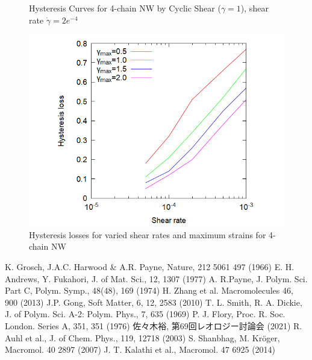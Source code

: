 \documentclass[uplatex,dvipdfmx,a4paper,10pt]{jsarticle}
\begin{document}
\begin{figure}[hb]
\begin{minipage}{0.33\hsize}
\begin{center}
        \caption{Hysteresis Curves for 4-chain NW by Cyclic Shear ($\gamma = 1$), shear rate $\dot{\gamma} = 2e^{-4}$}
        \label{fig:hyst}
	\end{center}
\end{minipage}
\begin{minipage}{0.33\hsize}
	\begin{center}
        \includegraphics[width=.9\textwidth]{hyst_shear.png}
        \caption{Hysteresis losses for varied shear rates and maximum strains for 4-chain NW}
        \label{fig:hystloss}
	\end{center}
\end{minipage}
\end{figure}

\vspace{-7mm}
\begin{thebibliography}{99}
     K. Grosch, J.A.C. Harwood \& A.R. Payne, Nature, 212 5061 497 (1966)
     E. H. Andrews, Y. Fukahori, J. of Mat. Sci., 12, 1307 (1977)
     A. R.Payne, J. Polym. Sci. Part C, Polym. Symp., 48(48), 169 (1974)
     H. Zhang et al. Macromolecules 46, 900 (2013)
     J.P. Gong, Soft Matter, 6, 12, 2583 (2010)
     T. L. Smith, R. A. Dickie, J. of Polym. Sci. A-2: Polym. Phys., 7, 635 (1969)
     P. J. Flory, Proc. R. Soc. London. Series A, 351, 351 (1976)
     佐々木裕, 第69回レオロジー討論会 (2021)
     R. Auhl et al., J. of Chem. Phys., 119, 12718 (2003)
     S. Shanbhag, M. Kr\"{o}ger, Macromol. 40 2897 (2007)
     J. T. Kalathi et al., Macromol. 47 6925 (2014)
\end{thebibliography}
\end{document}
